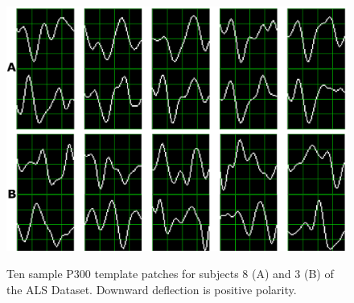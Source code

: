 \documentclass[utf8]{frontiersSCNS} %
\begin{document}
\begin{figure}[h!]
\centering
\includegraphics[width=15cm]{subject.png}\label{subject8}
\caption{Ten sample P300 template patches for subjects 8 (A) and 3 (B) of the ALS Dataset.  Downward deflection is positive polarity. }
\label{fig:p300templates}
\end{figure}
\end{document}

